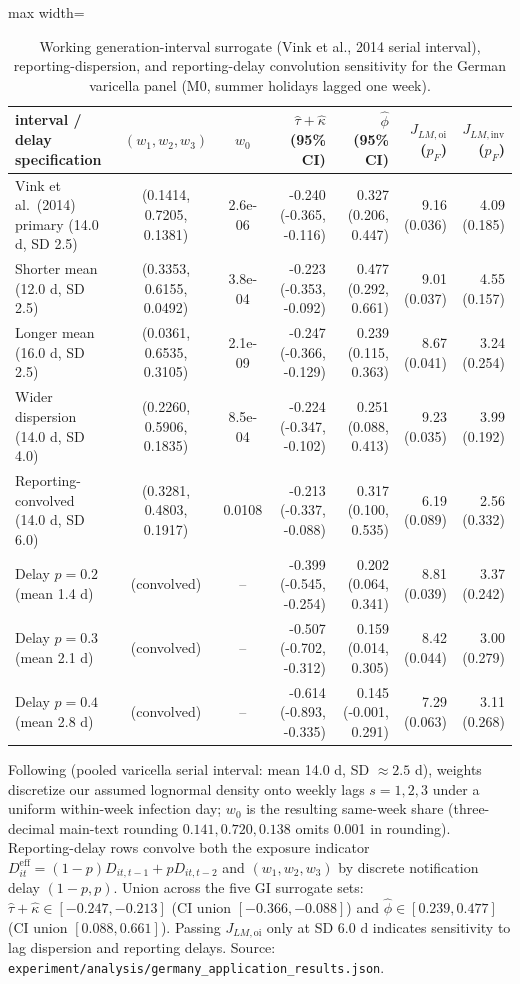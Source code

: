 \begin{table}[!t]
\centering
\caption{Working generation-interval surrogate (Vink et al., 2014 serial interval), reporting-dispersion, and reporting-delay convolution sensitivity for the German varicella panel (M0, summer holidays lagged one week).}
\label{tab:rev-gi}
\footnotesize
\setlength{\tabcolsep}{2.8pt}
\begin{adjustbox}{max width=\linewidth}
\begin{tabular}{lccrrrr}
\toprule
interval / delay specification & $(w_1, w_2, w_3)$ & $w_0$ & $\hat\tau+\hat\kappa$ (95\% CI) & $\hat\phi$ (95\% CI) & $J_{LM,\mathrm{oi}}$ ($p_F$) & $J_{LM,\mathrm{inv}}$ ($p_F$) \\
\midrule
Vink et al.\ (2014) primary (14.0 d, SD 2.5) & (0.1414, 0.7205, 0.1381) & 2.6e-06 & -0.240 (-0.365, -0.116) & 0.327 (0.206, 0.447) & 9.16 (0.036) & 4.09 (0.185) \\
Shorter mean (12.0 d, SD 2.5) & (0.3353, 0.6155, 0.0492) & 3.8e-04 & -0.223 (-0.353, -0.092) & 0.477 (0.292, 0.661) & 9.01 (0.037) & 4.55 (0.157) \\
Longer mean (16.0 d, SD 2.5) & (0.0361, 0.6535, 0.3105) & 2.1e-09 & -0.247 (-0.366, -0.129) & 0.239 (0.115, 0.363) & 8.67 (0.041) & 3.24 (0.254) \\
Wider dispersion (14.0 d, SD 4.0) & (0.2260, 0.5906, 0.1835) & 8.5e-04 & -0.224 (-0.347, -0.102) & 0.251 (0.088, 0.413) & 9.23 (0.035) & 3.99 (0.192) \\
Reporting-convolved (14.0 d, SD 6.0) & (0.3281, 0.4803, 0.1917) & 0.0108 & -0.213 (-0.337, -0.088) & 0.317 (0.100, 0.535) & 6.19 (0.089) & 2.56 (0.332) \\
\midrule
Delay $p=0.2$ (mean 1.4 d) & (convolved) & -- & -0.399 (-0.545, -0.254) & 0.202 (0.064, 0.341) & 8.81 (0.039) & 3.37 (0.242) \\
Delay $p=0.3$ (mean 2.1 d) & (convolved) & -- & -0.507 (-0.702, -0.312) & 0.159 (0.014, 0.305) & 8.42 (0.044) & 3.00 (0.279) \\
Delay $p=0.4$ (mean 2.8 d) & (convolved) & -- & -0.614 (-0.893, -0.335) & 0.145 (-0.001, 0.291) & 7.29 (0.063) & 3.11 (0.268) \\
\bottomrule
\end{tabular}
\end{adjustbox}
\par\smallskip\parbox{\linewidth}{\scriptsize Following \citet{vink2014serial} (pooled varicella serial interval: mean 14.0 d, SD $\approx 2.5$ d), weights discretize our assumed lognormal density onto weekly lags $s=1,2,3$ under a uniform within-week infection day; $w_0$ is the resulting same-week share (three-decimal main-text rounding $0.141, 0.720, 0.138$ omits 0.001 in rounding). Reporting-delay rows convolve both the exposure indicator $D_{it}^{\mathrm{eff}}=(1-p)D_{it,t-1}+pD_{it,t-2}$ and $(w_1,w_2,w_3)$ by discrete notification delay $(1-p,p)$. Union across the five GI surrogate sets: $\hat\tau+\hat\kappa\in[-0.247, -0.213]$ (CI union $[-0.366, -0.088]$) and $\hat\phi\in[0.239, 0.477]$ (CI union $[0.088, 0.661]$). Passing $J_{LM,\mathrm{oi}}$ only at SD 6.0 d indicates sensitivity to lag dispersion and reporting delays. Source: \texttt{experiment/analysis/germany\_application\_results.json}.}
\end{table}
